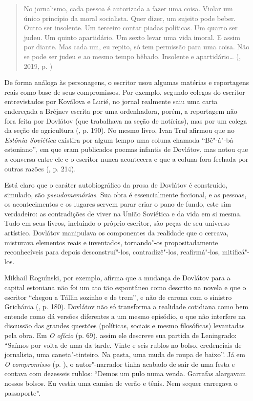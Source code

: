 \begin{quotation}
No jornalismo, cada pessoa é autorizada a fazer uma coisa. Violar um
único princípio da moral socialista. Quer dizer, um sujeito pode beber.
Outro ser insolente. Um terceiro contar piadas políticas. Um quarto ser
judeu. Um quinto apartidário. Um sexto levar uma vida imoral. E assim
por diante. Mas cada um, eu repito, só tem permissão para uma coisa. Não
se pode ser judeu e ao mesmo tempo bêbado. Insolente e apartidário\ldots{}
{}(, 2019, p. \pageref{ref2})
\end{quotation}

De forma análoga às personagens, o escritor usou algumas matérias e
reportagens reais como base de seus compromissos. Por exemplo, segundo
colegas do escritor entrevistados por Koválova e Lurié, no jornal
realmente saiu uma carta endereçada a Bréjnev escrita por uma
ordenhadora, porém, a reportagem não fora feita por Dovlátov (que
trabalhava na seção de notícias), mas por um colega da seção de
agricultura (, p. 190). No mesmo livro, Ivan Trul afirmou que no
\emph{Estônia Soviética} existira por algum tempo uma coluna chamada
``Bê"-á"-bá estoniano'', em que eram publicados poemas infantis de
Dovlátov, mas notou que a conversa entre ele e o escritor nunca
acontecera e que a coluna fora fechada por outras razões (, p.
214).

Está claro que o caráter autobiográfico da prosa de Dovlátov é
construído, simulado, são \emph{pseudomemórias}. Sua obra é
essencialmente ficcional, e as pessoas, os acontecimentos e os lugares
servem parar criar o pano de fundo, este sim verdadeiro: as contradições
de viver na União Soviética e da vida em si mesma. Tudo em seus livros,
incluindo o próprio escritor, são peças de seu universo artístico.
Dovlátov manipulava os componentes da realidade que o cercava, misturava
elementos reais e inventados, tornando"-os propositadamente reconhecíveis
para depois desconstruí"-los, contradizê"-los, reafirmá"-los, mitificá"-los.

Mikhail Roguínski, por exemplo, afirma que a mudança de Dovlátov para a
capital estoniana não foi um ato tão espontâneo como descrito na novela
e que o escritor ``chegou a Tállin sozinho e de trem'', e não de carona
com o sinistro Grichánia (, p. 180). Dovlátov não só transforma
a realidade cotidiana como bem entende como dá versões diferentes a um
mesmo episódio, o que não interfere na discussão das grandes questões
(políticas, sociais e mesmo filosóficas) levantadas pela obra. Em
\emph{O ofício} (p. 69), assim ele descreve sua partida de Leningrado:
``Saímos por volta de uma da tarde. Vinte e seis rublos no bolso,
credenciais de jornalista, uma caneta"-tinteiro. Na pasta, uma muda de
roupa de baixo''. Já em \emph{O compromisso} (p. \pageref{ref3}), o
autor"-narrador tinha acabado de sair de uma festa e contava com
dezesseis rublos: ``Demos um pulo numa venda. Garrafas alargavam nossos
bolsos. Eu vestia uma camisa de verão e tênis. Nem sequer carregava o
passaporte''.

